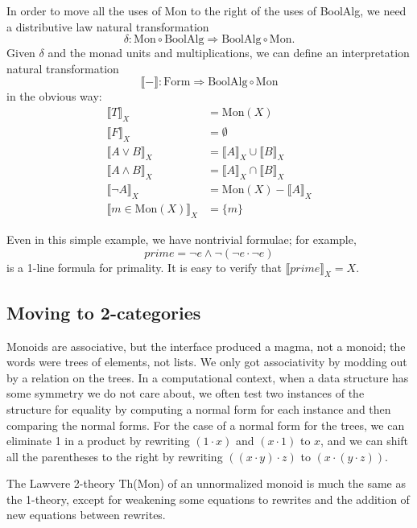 \documentclass{article}
\newcommand{\interp}[1]{\llbracket #1 \rrbracket}
\newcommand{\maps}{\colon}
\newcommand{\Mon}{\mathrm{Mon}}
\newcommand{\BoolAlg}{\mathrm{BoolAlg}}
\newcommand{\Form}{\mathrm{Form}}
\begin{document}
In order to move all the uses of Mon to the right of the uses of BoolAlg, we need a distributive law natural transformation
\[ \delta\maps \Mon \circ \BoolAlg \Rightarrow \BoolAlg \circ \Mon. \]
Given $\delta$ and the monad units and multiplications, we can define an interpretation natural transformation
\[ \interp{-}\maps \Form\Rightarrow \BoolAlg \circ \Mon \]
in the obvious way:
\begin{align*}
  \interp{T}_X &= \Mon(X)\\
  \interp{F}_X &= \emptyset\\
  \interp{{A}\lor{B}}_X &= \interp{A}_X \cup \interp{B}_X\\
  \interp{{A}\land{B}}_X &= \interp{A}_X \cap \interp{B}_X\\
  \interp{\neg A}_X &= \Mon(X) - \interp{A}_X\\
  \interp{m \in \Mon(X)}_X &= \{m\}
\end{align*}

Even in this simple example, we have nontrivial formulae; for example,
\[ prime = \neg e \land \neg(\neg e \cdot \neg e) \]
is a 1-line formula for primality.  It is easy to verify that $\interp{prime}_X = X.$

\subsection{Moving to 2-categories}

Monoids are associative, but the interface produced a magma, not a monoid; the words were trees of elements, not lists.  We only got associativity by modding out by a relation on the trees.  In a computational context, when a data structure has some symmetry we do not care about, we often test two instances of the structure for equality by computing a normal form for each instance and then comparing the normal forms.  For the case of a normal form for the trees, we can eliminate 1 in a product by rewriting $(1 \cdot x)$ and $(x \cdot 1)$ to $x$, and we can shift all the parentheses to the right by rewriting $((x \cdot y) \cdot z)$ to $(x \cdot (y \cdot z)).$

The Lawvere 2-theory Th(Mon) of an unnormalized monoid is much the same as the 1-theory, except for weakening some equations to rewrites and the addition of new equations between rewrites.
\end{document}
